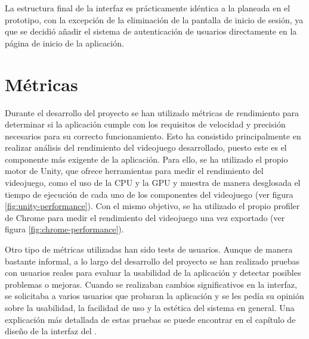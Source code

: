La estructura final de la interfaz es prácticamente idéntica a la planeada en el
prototipo, con la excepción de la eliminación de la pantalla de inicio de
sesión, ya que se decidió añadir el sistema de autenticación de usuarios
directamente en la página de inicio de la aplicación.

\section{Métricas}
\label{sec:metricas}
Durante el desarrollo del proyecto se han utilizado métricas de rendimiento para
determinar si la aplicación cumple con los requisitos de velocidad y precisión
necesarios para su correcto funcionamiento.  Esto ha consistido principalmente
en realizar análisis del rendimiento del videojuego desarrollado, puesto este es
el componente más exigente de la aplicación. Para ello, se ha utilizado el
propio motor de Unity, que ofrece herramientas para medir el rendimiento del
videojuego, como el uso de la CPU y la GPU y muestra de manera desglosada el
tiempo de ejecución de cada uno de los componentes del videojuego (ver figura
\ref{fig:unity-performance}). Con el mismo objetivo, se ha utilizado el propio
profiler de Chrome para medir el rendimiento del videojuego una vez exportado
(ver figura \ref{fig:chrome-performance}).



Otro tipo de métricas utilizadas han sido tests de usuarios. Aunque de manera
bastante informal, a lo largo del desarrollo del proyecto se han realizado
pruebas con usuarios reales para evaluar la usabilidad de la aplicación y
detectar posibles problemas o mejoras. Cuando se realizaban cambios
significativos en la interfaz, se solicitaba a varios usuarios que probaran la
aplicación y se les pedía su opinión sobre la usabilidad, la facilidad de uso y
la estética del sistema en general. Una explicación más detallada de estas
pruebas se puede encontrar en el capítulo de diseño de la interfaz del
\segundoAnexo.

